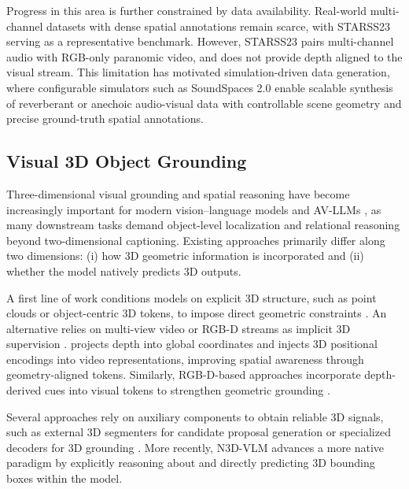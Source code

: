 Progress in this area is further constrained by data availability. 
Real-world multi-channel datasets with dense spatial annotations remain scarce, with STARSS23 \citep{shimada2023starss23} serving as a representative benchmark. 
However, STARSS23 pairs multi-channel audio with RGB-only paranomic video, and does not provide depth aligned to the visual stream. 
This limitation has motivated simulation-driven data generation, where configurable simulators such as SoundSpaces 2.0 \citep{chen22soundspaces2} enable scalable synthesis of reverberant or anechoic audio-visual data with controllable scene geometry and precise ground-truth spatial annotations.

\subsection{Visual 3D Object Grounding}

Three-dimensional visual grounding and spatial reasoning have become increasingly important for modern vision–language models \citep{huang2024chat, chen2024grounded, Qwen3-VL, guo2025seed1, zhu2025internvl3} and AV-LLMs \citep{senocak2023sound, chowdhury2024meerkat, li2024groundinggpt}, as many downstream tasks demand object-level localization and relational reasoning beyond two-dimensional captioning. Existing approaches primarily differ along two dimensions: (i) how 3D geometric information is incorporated and (ii) whether the model natively predicts 3D outputs.

A first line of work conditions models on explicit 3D structure, such as point clouds or object-centric 3D tokens, to impose direct geometric constraints \citep{huang2024chat, mao2025spatiallm}. 
An alternative relies on multi-view video or RGB-D streams as implicit 3D supervision \citep{qi2025gpt4scene, zheng2025video, chen2024spatialvlm, zhu2024llava}. 
\citep{zheng2025video} projects depth into global coordinates and injects 3D positional encodings into video representations, improving spatial awareness through geometry-aligned tokens. 
Similarly, RGB-D-based approaches incorporate depth-derived cues into visual tokens to strengthen geometric grounding \citep{chen2024spatialvlm, zhu2024llava}.

Several approaches rely on auxiliary components to obtain reliable 3D signals, such as external 3D segmenters for candidate proposal generation or specialized decoders for 3D grounding \citep{zheng2025video, zhu2024llava}. More recently, N3D-VLM \citep{wang2025n3d} advances a more native paradigm by explicitly reasoning about and directly predicting 3D bounding boxes within the model.

